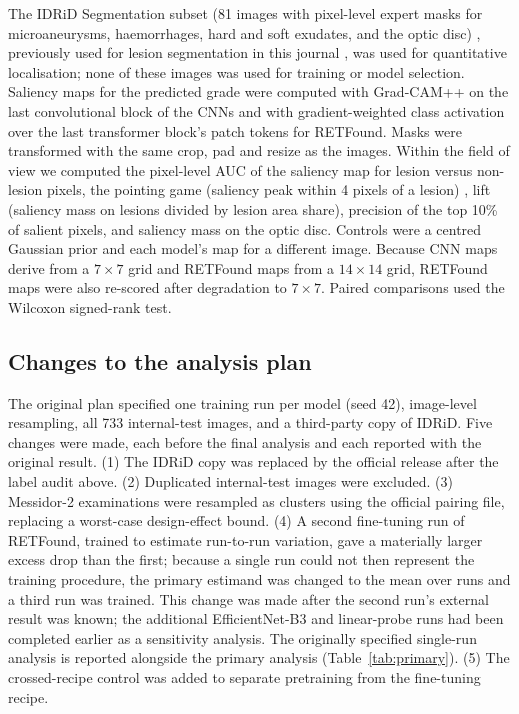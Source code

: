 \documentclass[pdflatex,sn-basic,Numbered]{sn-jnl}
\begin{document}
The IDRiD Segmentation subset (81 images with pixel-level expert masks for microaneurysms, haemorrhages, hard and soft exudates, and the optic disc) \cite{porwal2018}, previously used for lesion segmentation in this journal \cite{yuan2023}, was used for quantitative localisation; none of these images was used for training or model selection. Saliency maps for the predicted grade were computed with Grad-CAM++ \cite{chattopadhay2018gradcampp} on the last convolutional block of the CNNs and with gradient-weighted class activation over the last transformer block's patch tokens for RETFound. Masks were transformed with the same crop, pad and resize as the images. Within the field of view we computed the pixel-level AUC of the saliency map for lesion versus non-lesion pixels, the pointing game (saliency peak within 4 pixels of a lesion) \cite{zhang2018topdown}, lift (saliency mass on lesions divided by lesion area share), precision of the top 10\% of salient pixels, and saliency mass on the optic disc. Controls were a centred Gaussian prior and each model's map for a different image. Because CNN maps derive from a $7\times7$ grid and RETFound maps from a $14\times14$ grid, RETFound maps were also re-scored after degradation to $7\times7$. Paired comparisons used the Wilcoxon signed-rank test.

\subsection{Changes to the analysis plan}\label{sec:changes}

The original plan specified one training run per model (seed 42), image-level resampling, all 733 internal-test images, and a third-party copy of IDRiD. Five changes were made, each before the final analysis and each reported with the original result. (1) The IDRiD copy was replaced by the official release after the label audit above. (2) Duplicated internal-test images were excluded. (3) Messidor-2 examinations were resampled as clusters using the official pairing file, replacing a worst-case design-effect bound. (4) A second fine-tuning run of RETFound, trained to estimate run-to-run variation, gave a materially larger excess drop than the first; because a single run could not then represent the training procedure, the primary estimand was changed to the mean over runs and a third run was trained. This change was made after the second run's external result was known; the additional EfficientNet-B3 and linear-probe runs had been completed earlier as a sensitivity analysis. The originally specified single-run analysis is reported alongside the primary analysis (Table~\ref{tab:primary}). (5) The crossed-recipe control was added to separate pretraining from the fine-tuning recipe.
\end{document}
